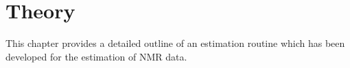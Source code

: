 \chapter{Theory}
\label{chap:theory}

This chapter provides a detailed outline of an estimation routine which has
been developed for the estimation of \ac{NMR} data.







